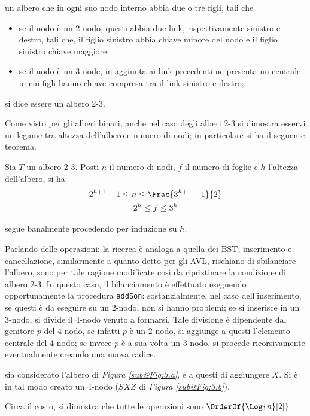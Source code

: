 \documentclass{subfiles}
\begin{document}
\begin{Definition*}
    un albero che in ogni suo nodo interno abbia due o tre figli, tali che
    \begin{itemize}
        \item se il nodo è un 2-nodo, questi abbia due link, rispettivamente sinistro e destro, tali che,
              il figlio sinistro abbia chiave minore del nodo e il figlio sinistro chiave maggiore;
        \item se il nodo è un 3-node, in aggiunta ai link precedenti ne presenta un centrale in cui figli hanno chiave compresa tra il link sinistro e destro;
    \end{itemize}
    si dice essere un albero 2-3.
\end{Definition*}

Come visto per gli alberi binari, anche nel caso degli alberi 2-3 si dimostra esservi un legame tra altezza dell'albero e numero di nodi;
in particolare si ha il seguente teorema.

\begin{Theorem}
    Sia \(T\) un albero 2-3.  Posti \(n\) il numero di nodi, \(f\) il numero di foglie e \(h\) l'altezza dell'albero, si ha
    \[\begin{gathered}
            2^{h + 1} - 1 \le n \le \Frac{3^{h + 1} - 1}{2} \\
            2^{h} \le f \le 3^{h}
        \end{gathered}\]
    \begin{Proof*}
        segue banalmente procedendo per induzione su \(h\).
    \end{Proof*}
\end{Theorem}

Parlando delle operazioni: la ricerca è analoga a quella dei BST; inserimento e cancellazione, similarmente a quanto detto per gli AVL,
rischiano di sbilanciare l'albero, sono per tale ragione modificate così da ripristinare la condizione di albero 2-3.
In questo caso, il bilanciamento è effettuato eseguendo opportunamente la procedura \lstinline{addSon}:
sostanzialmente, nel caso dell'inserimento, se questi è da eseguire su un 2-nodo, non si hanno problemi; se si inserisce in un 3-nodo,
si divide il 4-nodo venuto a formarsi. Tale divisione è dipendente dal genitore \(p\) del 4-nodo, se infatti \(p\) è un 2-nodo,
si aggiunge a questi l'elemento centrale del 4-nodo;
se invece \(p\) è a sua volta un 3-nodo, si procede ricorsivamente eventualmente creando una nuova radice.

\begin{Example*}
    sia considerato l'albero di \emph{Figura \ref{sub@Fig:3.a}}, e a questi di aggiungere \(X\).
    Si è in tal modo creato un 4-nodo (\(SXZ\) di \emph{Figura \ref{sub@Fig:3.b}}).
    
\end{Example*}
Circa il costo, si dimostra che tutte le operazioni sono \(\OrderOf{\Log{n}[2]}\).
\end{document}
